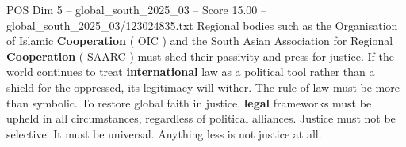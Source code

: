 \begin{textsample}{POS Dim 5 – global\_south\_2025\_03 – Score 15.00 – global\_south\_2025\_03/123024835.txt}
Regional bodies such as the Organisation of Islamic \textbf{Cooperation} ( OIC ) and the South Asian Association for Regional \textbf{Cooperation} ( SAARC ) must shed their passivity and press for justice.
If the world continues to treat \textbf{international} law as a political tool rather than a shield for the oppressed, its legitimacy will wither.
The rule of law must be more than symbolic.
To restore global faith in justice, \textbf{legal} frameworks must be upheld in all circumstances, regardless of political alliances.
Justice must not be selective.
It must be universal.
Anything less is not justice at all.

\end{textsample}

